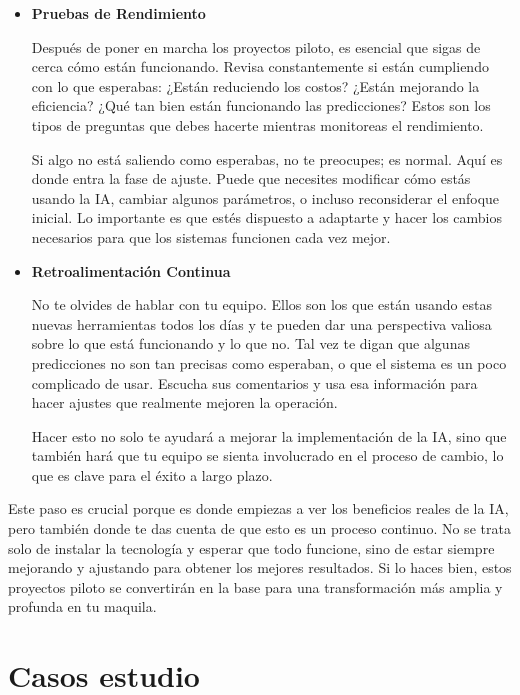 \documentclass[
  letterpaper,
]{book}
\begin{document}
\begin{itemize}
\item
  \textbf{Pruebas de Rendimiento}

  Después de poner en marcha los proyectos piloto, es esencial que sigas
  de cerca cómo están funcionando. Revisa constantemente si están
  cumpliendo con lo que esperabas: ¿Están reduciendo los costos? ¿Están
  mejorando la eficiencia? ¿Qué tan bien están funcionando las
  predicciones? Estos son los tipos de preguntas que debes hacerte
  mientras monitoreas el rendimiento.

  Si algo no está saliendo como esperabas, no te preocupes; es normal.
  Aquí es donde entra la fase de ajuste. Puede que necesites modificar
  cómo estás usando la IA, cambiar algunos parámetros, o incluso
  reconsiderar el enfoque inicial. Lo importante es que estés dispuesto
  a adaptarte y hacer los cambios necesarios para que los sistemas
  funcionen cada vez mejor.
\item
  \textbf{Retroalimentación Continua}

  No te olvides de hablar con tu equipo. Ellos son los que están usando
  estas nuevas herramientas todos los días y te pueden dar una
  perspectiva valiosa sobre lo que está funcionando y lo que no. Tal vez
  te digan que algunas predicciones no son tan precisas como esperaban,
  o que el sistema es un poco complicado de usar. Escucha sus
  comentarios y usa esa información para hacer ajustes que realmente
  mejoren la operación.

  Hacer esto no solo te ayudará a mejorar la implementación de la IA,
  sino que también hará que tu equipo se sienta involucrado en el
  proceso de cambio, lo que es clave para el éxito a largo plazo.
\end{itemize}

Este paso es crucial porque es donde empiezas a ver los beneficios
reales de la IA, pero también donde te das cuenta de que esto es un
proceso continuo. No se trata solo de instalar la tecnología y esperar
que todo funcione, sino de estar siempre mejorando y ajustando para
obtener los mejores resultados. Si lo haces bien, estos proyectos piloto
se convertirán en la base para una transformación más amplia y profunda
en tu maquila.


\chapter{Casos estudio}\label{casos-estudio}
\end{document}
